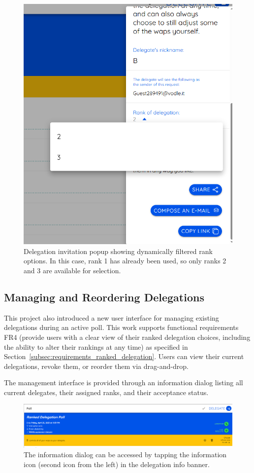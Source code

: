 \begin{figure}[H]
  \centering
  \includegraphics[width=0.4\linewidth]{../common/vodle_screenshots/ranked_inv.png}
  \caption{Delegation invitation popup showing dynamically filtered rank options. In this case, rank 1 has already been used, so only ranks 2 and 3 are available for selection.}
\end{figure}

\subsection{Managing and Reordering Delegations}

This project also introduced a new user interface for managing existing delegations during an active poll. This work supports functional requirements FR4 (provide users with a clear view of their ranked delegation choices, including the ability to alter their rankings at any time) as specified in Section~\ref{subsec:requirements_ranked_delegation}. Users can view their current delegations, revoke them, or reorder them via drag-and-drop.

The management interface is provided through an information dialog listing all current delegates, their assigned ranks, and their acceptance status.

\begin{figure}[H]
  \centering
  \includegraphics[width=\linewidth]{../common/vodle_screenshots/ranked_where_info_button.png}
  \caption{The information dialog can be accessed by tapping the information icon (second icon from the left) in the delegation info banner.}
\end{figure}

